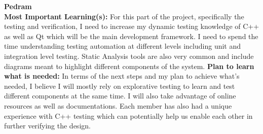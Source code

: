 \documentclass[12pt, titlepage]{article}
\begin{document}
\noindent\textbf{Pedram}\\
\textbf{Most Important Learning(s):} For this part of the project, specifically the testing and verification, I need to increase my dynamic testing knowledge of C++ as well as Qt which will be the main development framework. I need to spend the time understanding testing automation at different levels including unit and integration level testing. Static Analysis tools are also very common and include diagrams meant to highlight different components of the system. 
\textbf{Plan to learn what is needed:} In terms of the next steps and my plan to achieve what’s needed, I believe I will mostly rely on explorative testing to learn and test different components at the same time. I will also take advantage of online resources as well as documentations. Each member has also had a unique experience with C++ testing which can potentially help us enable each other in further verifying the design. 
\end{document}
